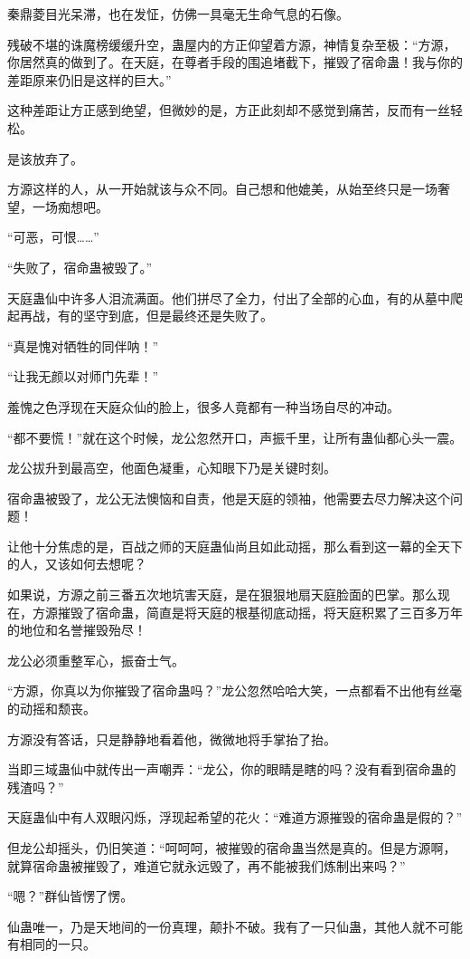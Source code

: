 \begin{this_body}
秦鼎菱目光呆滞，也在发怔，仿佛一具毫无生命气息的石像。

残破不堪的诛魔榜缓缓升空，蛊屋内的方正仰望着方源，神情复杂至极：“方源，你居然真的做到了。在天庭，在尊者手段的围追堵截下，摧毁了宿命蛊！我与你的差距原来仍旧是这样的巨大。”

这种差距让方正感到绝望，但微妙的是，方正此刻却不感觉到痛苦，反而有一丝轻松。

是该放弃了。

方源这样的人，从一开始就该与众不同。自己想和他媲美，从始至终只是一场奢望，一场痴想吧。

“可恶，可恨……”

“失败了，宿命蛊被毁了。”

天庭蛊仙中许多人泪流满面。他们拼尽了全力，付出了全部的心血，有的从墓中爬起再战，有的坚守到底，但是最终还是失败了。

“真是愧对牺牲的同伴呐！”

“让我无颜以对师门先辈！”

羞愧之色浮现在天庭众仙的脸上，很多人竟都有一种当场自尽的冲动。

“都不要慌！”就在这个时候，龙公忽然开口，声振千里，让所有蛊仙都心头一震。

龙公拔升到最高空，他面色凝重，心知眼下乃是关键时刻。

宿命蛊被毁了，龙公无法懊恼和自责，他是天庭的领袖，他需要去尽力解决这个问题！

让他十分焦虑的是，百战之师的天庭蛊仙尚且如此动摇，那么看到这一幕的全天下的人，又该如何去想呢？

如果说，方源之前三番五次地坑害天庭，是在狠狠地扇天庭脸面的巴掌。那么现在，方源摧毁了宿命蛊，简直是将天庭的根基彻底动摇，将天庭积累了三百多万年的地位和名誉摧毁殆尽！

龙公必须重整军心，振奋士气。

“方源，你真以为你摧毁了宿命蛊吗？”龙公忽然哈哈大笑，一点都看不出他有丝毫的动摇和颓丧。

方源没有答话，只是静静地看着他，微微地将手掌抬了抬。

当即三域蛊仙中就传出一声嘲弄：“龙公，你的眼睛是瞎的吗？没有看到宿命蛊的残渣吗？”

天庭蛊仙中有人双眼闪烁，浮现起希望的花火：“难道方源摧毁的宿命蛊是假的？”

但龙公却摇头，仍旧笑道：“呵呵呵，被摧毁的宿命蛊当然是真的。但是方源啊，就算宿命蛊被摧毁了，难道它就永远毁了，再不能被我们炼制出来吗？”

“嗯？”群仙皆愣了愣。

仙蛊唯一，乃是天地间的一份真理，颠扑不破。我有了一只仙蛊，其他人就不可能有相同的一只。


\end{this_body}
